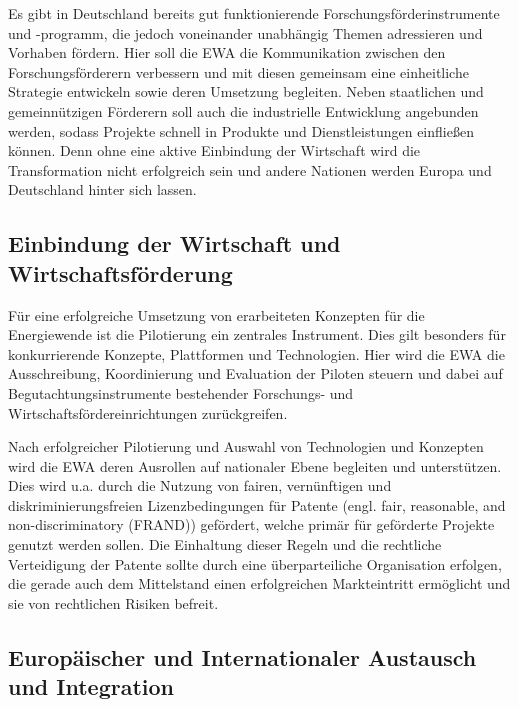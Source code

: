 Es gibt in Deutschland bereits gut funktionierende Forschungsförderinstrumente und -programm, die jedoch voneinander unabhängig Themen adressieren und Vorhaben fördern.
Hier soll die EWA die Kommunikation zwischen den Forschungsförderern verbessern und mit diesen gemeinsam eine einheitliche Strategie entwickeln sowie deren Umsetzung begleiten.
Neben staatlichen und gemeinnützigen Förderern soll auch die industrielle Entwicklung angebunden werden, sodass Projekte schnell in Produkte und Dienstleistungen einfließen können.
Denn ohne eine aktive Einbindung der Wirtschaft wird die Transformation nicht erfolgreich sein und andere Nationen werden Europa und Deutschland hinter sich lassen.

\subsection{Einbindung der Wirtschaft und Wirtschaftsförderung}

Für eine erfolgreiche Umsetzung von erarbeiteten Konzepten für die Energiewende ist die Pilotierung ein zentrales Instrument.
Dies gilt besonders für konkurrierende Konzepte, Plattformen und Technologien.
Hier wird die EWA die Ausschreibung, Koordinierung und Evaluation der Piloten steuern und dabei auf Begutachtungsinstrumente bestehender Forschungs- und Wirtschaftsfördereinrichtungen zurückgreifen.

Nach erfolgreicher Pilotierung und Auswahl von Technologien und Konzepten wird die EWA deren Ausrollen auf nationaler Ebene begleiten und unterstützen.
Dies wird u.a. durch die Nutzung von fairen, vernünftigen und diskriminierungsfreien Lizenzbedingungen für Patente (engl. fair, reasonable, and non-discriminatory (FRAND)) gefördert, welche primär für geförderte Projekte genutzt werden sollen.
Die Einhaltung dieser Regeln und die rechtliche Verteidigung der Patente sollte durch eine überparteiliche Organisation erfolgen, die gerade auch dem Mittelstand einen erfolgreichen Markteintritt ermöglicht und sie von rechtlichen Risiken befreit.


\subsection{Europäischer und Internationaler Austausch und Integration}

